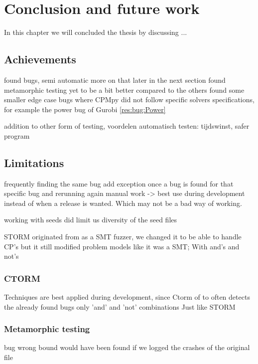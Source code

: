 \chapter{Conclusion and future work}
\label{cha:conclusion}
\label{con:intro}
In this chapter we will concluded the thesis by discussing ...

\section{Achievements}
\label{con:Achievements}
found bugs, 
semi automatic more on that later in the next section 
found metamorphic testing yet to be a bit better compared to the others
found some smaller edge case bugs where CPMpy did not follow specific solvers specifications, for example the power bug of Gurobi \ref{res:bug:Power}


addition to other form of testing, 
voordelen automatisch testen: tijdswinst, safer program

\section{Limitations}
\label{con:Limitations}
frequently finding the same bug
add exception once a bug is found for that specific bug and rerunning again manual work
-> best use during development instead of when a release is wanted. 
Which may not be a bad way of working.

working with seeds did limit us
diversity of the seed files  



STORM originated from as a SMT fuzzer, we changed it to be able to handle CP's 
but it still modified problem models like it was a SMT; With and's and not's

\subsection{CTORM}
Techniques are best applied during development, since Ctorm of to often detects the already found bugs
only 'and' and 'not' combinations Just like STORM



\subsection{Metamorphic testing}
bug wrong bound would have been found if we logged the crashes of the original file 

